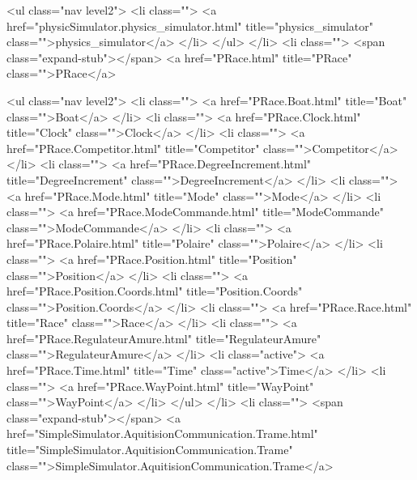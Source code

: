                         <ul class="nav level2">
                          <li class="">
                            <a href="physicSimulator.physics_simulator.html" title="physics_simulator" class="">physics_simulator</a>
                          </li>
                        </ul>  </li>
                    <li class="">
                      <span class="expand-stub"></span>
                      <a href="PRace.html" title="PRace" class="">PRace</a>
                        
                        <ul class="nav level2">
                          <li class="">
                            <a href="PRace.Boat.html" title="Boat" class="">Boat</a>
                          </li>
                          <li class="">
                            <a href="PRace.Clock.html" title="Clock" class="">Clock</a>
                          </li>
                          <li class="">
                            <a href="PRace.Competitor.html" title="Competitor" class="">Competitor</a>
                          </li>
                          <li class="">
                            <a href="PRace.DegreeIncrement.html" title="DegreeIncrement" class="">DegreeIncrement</a>
                          </li>
                          <li class="">
                            <a href="PRace.Mode.html" title="Mode" class="">Mode</a>
                          </li>
                          <li class="">
                            <a href="PRace.ModeCommande.html" title="ModeCommande" class="">ModeCommande</a>
                          </li>
                          <li class="">
                            <a href="PRace.Polaire.html" title="Polaire" class="">Polaire</a>
                          </li>
                          <li class="">
                            <a href="PRace.Position.html" title="Position" class="">Position</a>
                          </li>
                          <li class="">
                            <a href="PRace.Position.Coords.html" title="Position.Coords" class="">Position.Coords</a>
                          </li>
                          <li class="">
                            <a href="PRace.Race.html" title="Race" class="">Race</a>
                          </li>
                          <li class="">
                            <a href="PRace.RegulateurAmure.html" title="RegulateurAmure" class="">RegulateurAmure</a>
                          </li>
                          <li class="active">
                            <a href="PRace.Time.html" title="Time" class="active">Time</a>
                          </li>
                          <li class="">
                            <a href="PRace.WayPoint.html" title="WayPoint" class="">WayPoint</a>
                          </li>
                        </ul>  </li>
                    <li class="">
                      <span class="expand-stub"></span>
                      <a href="SimpleSimulator.AquitisionCommunication.Trame.html" title="SimpleSimulator.AquitisionCommunication.Trame" class="">SimpleSimulator.AquitisionCommunication.Trame</a>
                        
